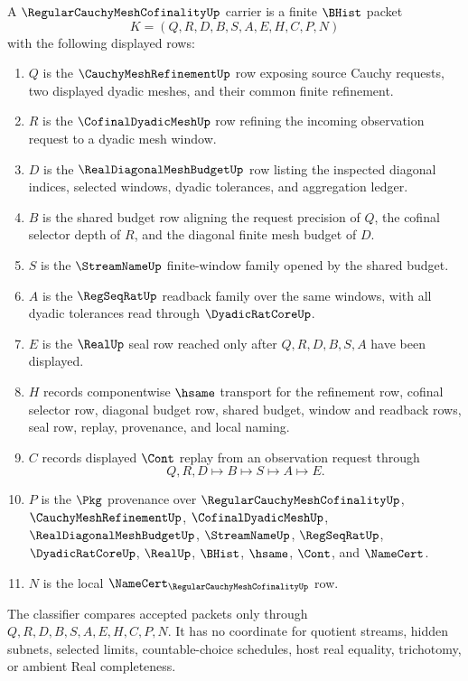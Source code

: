 \begin{definition}
\label{def:regular-cauchy-mesh-cofinality-carrier}
A $\RegularCauchyMeshCofinalityUp$ carrier is a finite $\BHist$ packet
$$
K=(Q,R,D,B,S,A,E,H,C,P,N)
$$
with the following displayed rows:
\begin{enumerate}
\item $Q$ is the $\CauchyMeshRefinementUp$ row exposing source Cauchy requests, two displayed dyadic meshes, and their common finite refinement.
\item $R$ is the $\CofinalDyadicMeshUp$ row refining the incoming observation request to a dyadic mesh window.
\item $D$ is the $\RealDiagonalMeshBudgetUp$ row listing the inspected diagonal indices, selected windows, dyadic tolerances, and aggregation ledger.
\item $B$ is the shared budget row aligning the request precision of $Q$, the cofinal selector depth of $R$, and the diagonal finite mesh budget of $D$.
\item $S$ is the $\StreamNameUp$ finite-window family opened by the shared budget.
\item $A$ is the $\RegSeqRatUp$ readback family over the same windows, with all dyadic tolerances read through $\DyadicRatCoreUp$.
\item $E$ is the $\RealUp$ seal row reached only after $Q,R,D,B,S,A$ have been displayed.
\item $H$ records componentwise $\hsame$ transport for the refinement row, cofinal selector row, diagonal budget row, shared budget, window and readback rows, seal row, replay, provenance, and local naming.
\item $C$ records displayed $\Cont$ replay from an observation request through
$$
Q,R,D \longmapsto B \longmapsto S \longmapsto A \longmapsto E .
$$
\item $P$ is the $\Pkg$ provenance over $\RegularCauchyMeshCofinalityUp$, $\CauchyMeshRefinementUp$, $\CofinalDyadicMeshUp$, $\RealDiagonalMeshBudgetUp$, $\StreamNameUp$, $\RegSeqRatUp$, $\DyadicRatCoreUp$, $\RealUp$, $\BHist$, $\hsame$, $\Cont$, and $\NameCert$.
\item $N$ is the local $\NameCert_{\RegularCauchyMeshCofinalityUp}$ row.
\end{enumerate}
The classifier compares accepted packets only through $Q,R,D,B,S,A,E,H,C,P,N$. It has no coordinate for quotient streams, hidden subnets, selected limits, countable-choice schedules, host real equality, trichotomy, or ambient Real completeness.
\end{definition}

